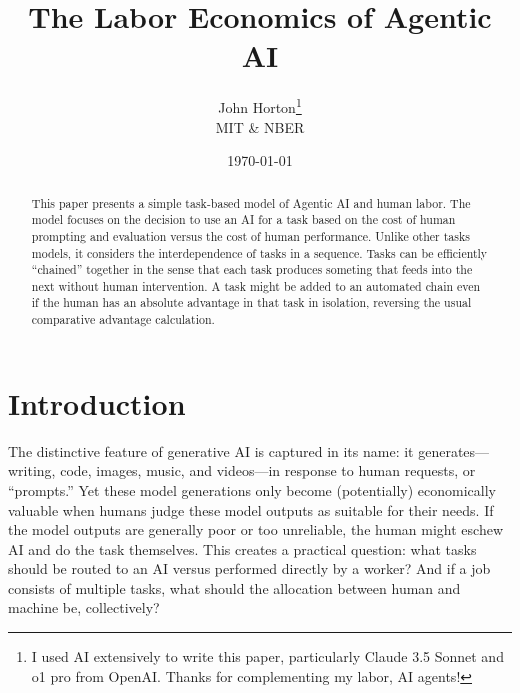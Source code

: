 \documentclass{article}
\begin{document}
\title{The Labor Economics of Agentic AI}
\author{John Horton\footnote{I used AI extensively to write this paper, particularly Claude 3.5 Sonnet and o1 pro from OpenAI. Thanks for complementing my labor, AI agents!}\\MIT \& NBER}
\date{\today{}}

\newcommand{\machine}[1]{\langle #1 \rangle}
\newcommand{\human}[1]{( #1 )}
\newcommand{\cost}[1]{C\{ #1 \}}
\newcommand{\costdo}[1]{C_H\{ #1 \}}
\newcommand{\costmanage}[1]{C_M\{ #1 \}}

\newcommand{\topic}[1]{\paragraph{#1}}

\maketitle

\begin{abstract}
\noindent This paper presents a simple task-based model of Agentic AI and human labor.
The model focuses on the decision to use an AI for a task based on the cost of human prompting and evaluation versus the cost of human performance. 
Unlike other tasks models, it considers the interdependence of tasks in a sequence. 
Tasks can be efficiently ``chained'' together in the sense that each task produces someting that feeds into the next without human intervention.
A task might be added to an automated chain even if the human has an absolute advantage in that task in isolation, reversing the usual comparative advantage calculation.
\end{abstract}

\onehalfspacing
  
\section{Introduction}
The distinctive feature of generative AI is captured in its name: it generates---writing, code, images, music, and videos---in response to human requests, or ``prompts.''
Yet these model generations only become (potentially) economically valuable when humans judge these model outputs as suitable for their needs.
If the model outputs are generally poor or too unreliable, the human might eschew AI and do the task themselves.
This creates a practical question: what tasks should be routed to an AI versus performed directly by a worker?
And if a job consists of multiple tasks, what should the allocation between human and machine be, collectively?
\end{document}
